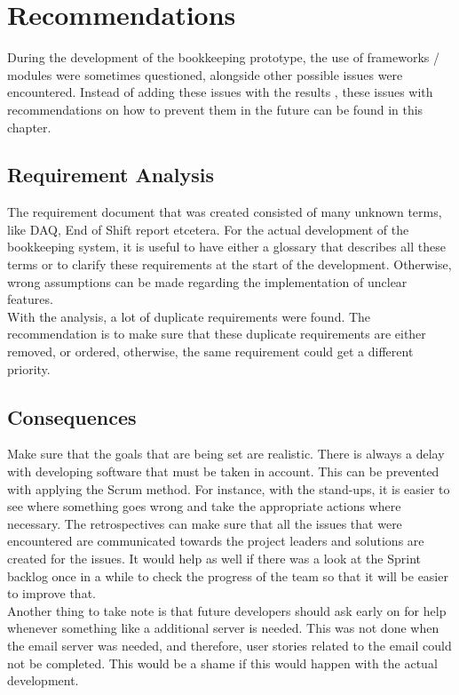 \documentclass[paper=a4, fontsize=11pt,twoside]{scrartcl}	%
\begin{document}
\newpage
\section{Recommendations}
During the development of the bookkeeping prototype, the use of frameworks / modules were sometimes questioned, alongside other possible issues were encountered. Instead of adding these issues with the results , these issues with recommendations on how to prevent them in the future can be found in this chapter. \\ 


\subsection{Requirement Analysis}
The requirement document that was created consisted of many unknown terms, like DAQ, End of Shift report etcetera. For the actual development of the bookkeeping system, it is useful to have either a glossary that describes all these terms or to clarify these requirements at the start of the development. Otherwise, wrong assumptions can be made regarding the implementation of unclear features. \\
With the analysis, a lot of duplicate requirements were found. The recommendation is to make sure that these duplicate requirements are either removed, or ordered, otherwise, the same requirement could get a different priority. \\


\subsection{Consequences}
Make sure that the goals that are being set are realistic. There is always a delay with developing software that must be taken in account. This can be prevented with applying the Scrum method. For instance, with the stand-ups, it is easier to see where something goes wrong and take the appropriate actions where necessary. The retrospectives can make sure that all the issues that were encountered are communicated towards the project leaders and solutions are created for the issues. It would help as well if there was a look at the Sprint backlog once in a while to check the progress of the team so that it will be easier to improve that. \\
Another thing to take note is that future developers should ask early on for help whenever something like a additional server is needed. This was not done when the email server was needed, and therefore, user stories related to the email could not be completed. This would be a shame if this would happen with the actual development.
\end{document}
